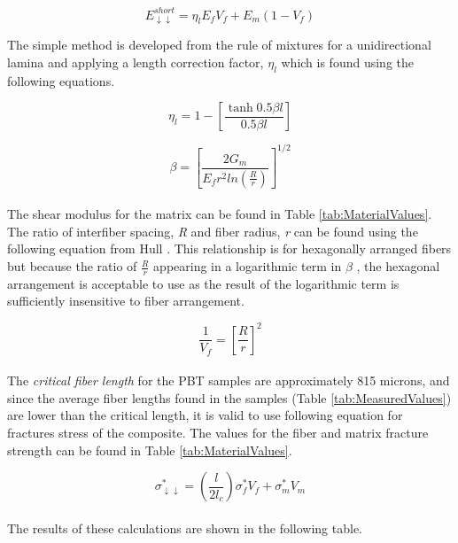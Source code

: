 \documentclass[11pt]{article}
\begin{document}
\begin{equation} \label{eq:simple}
E^{short}_{\downarrow \downarrow} = \eta_l E_f V_f + E_m(1-V_f)
\end{equation}

The simple method is developed from the rule of mixtures for a unidirectional lamina and applying a length correction factor, \(\eta_l\) which is found using the following equations.

\begin{equation}
\eta_l = 1- \left[\frac{\tanh 0.5\beta l}{0.5\beta l} \right]
\end{equation}

\begin{equation}
\beta=\left[\frac{2G_m}{E_fr^2 ln(\frac{R}{r})}\right]^{1/2}
\end{equation}
\\
The shear modulus for the matrix can be found in Table \ref{tab:MaterialValues}. The ratio of interfiber spacing, \textit{R} and fiber radius, \textit{r} can be found using the following equation from Hull \cite{hull}. This relationship is for hexagonally arranged fibers but because the ratio of \(\frac{R}{r}\) appearing in a logarithmic term in \(\beta\) , the hexagonal arrangement is acceptable to use as the result of the logarithmic term is sufficiently insensitive to fiber arrangement.

\begin{equation}
\frac{1}{V_f}=\left[\frac{R}{r}\right]^2
\end{equation}
\\

The \textit{critical fiber length} for the PBT samples are approximately 815 microns, and since the average fiber lengths found in the samples (Table \ref{tab:MeasuredValues}) are lower than the critical length, it is valid to use following equation for fractures stress of the composite. The values for the fiber and matrix fracture strength can be found in Table \ref{tab:MaterialValues}.
 
\begin{equation} \label{eq:fracture}
\sigma^*_{\downarrow \downarrow} = \left( \frac{l}{2l_c}\right) \sigma_f^* V_f + \sigma^*_m V_m
\end{equation}
\\

The results of these calculations are shown in the following table.
\end{document}
